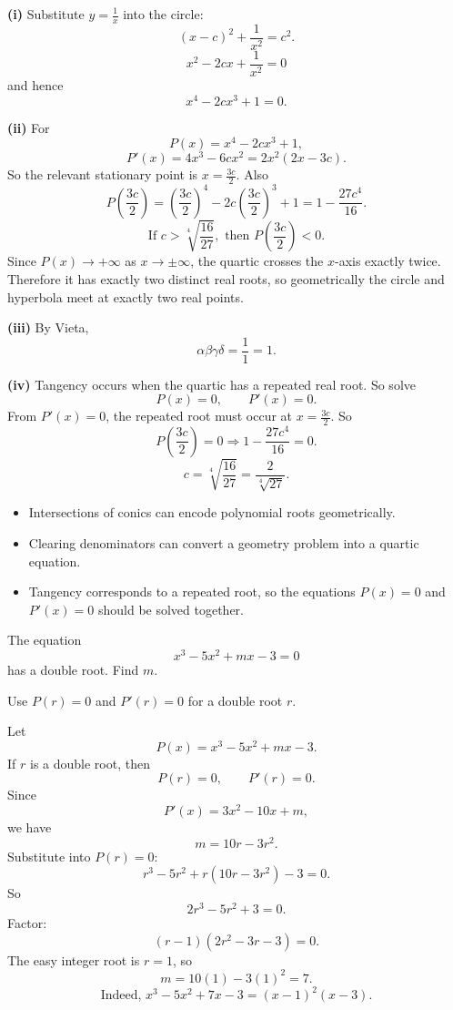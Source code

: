 \begin{solution}
\textbf{(i)} Substitute $y=\frac1x$ into the circle:
\[
(x-c)^2+\frac1{x^2}=c^2.
\]
\[
x^2-2cx+\frac1{x^2}=0
\]
and hence
\[
\boxed{x^4-2cx^3+1=0.}
\]

\textbf{(ii)} For
\[
P(x)=x^4-2cx^3+1,
\]
\[
P'(x)=4x^3-6cx^2=2x^2(2x-3c).
\]
So the relevant stationary point is $x=\frac{3c}{2}$. Also
\[
P\!\left(\frac{3c}{2}\right)=\left(\frac{3c}{2}\right)^4-2c\left(\frac{3c}{2}\right)^3+1
=1-\frac{27c^4}{16}.
\]
\[
\text{If }c>\sqrt[4]{\frac{16}{27}},\text{ then }P\!\left(\frac{3c}{2}\right)<0.
\]
Since $P(x)\to+\infty$ as $x\to\pm\infty$, the quartic crosses the $x$-axis exactly twice. Therefore it has exactly two distinct real roots, so geometrically the circle and hyperbola meet at exactly two real points.

\textbf{(iii)} By Vieta,
\[
\alpha\beta\gamma\delta=\frac{1}{1}=\boxed{1}.
\]

\textbf{(iv)} Tangency occurs when the quartic has a repeated real root. So solve
\[
P(x)=0,\qquad P'(x)=0.
\]
From $P'(x)=0$, the repeated root must occur at $x=\frac{3c}{2}$. So
\[
P\!\left(\frac{3c}{2}\right)=0
\Rightarrow 1-\frac{27c^4}{16}=0.
\]
\[
\boxed{c=\sqrt[4]{\frac{16}{27}}=\frac{2}{\sqrt[4]{27}}.}
\]
\end{solution}

\begin{takeaways}
\begin{itemize}[leftmargin=*]
\item Intersections of conics can encode polynomial roots geometrically.
\item Clearing denominators can convert a geometry problem into a quartic equation.
\item Tangency corresponds to a repeated root, so the equations $P(x)=0$ and $P'(x)=0$ should be solved together.
\end{itemize}
\end{takeaways}

\begin{problem}
The equation
\[
x^3-5x^2+mx-3=0
\]
has a double root. Find $m$.
\end{problem}

\begin{hintbox}
Use $P(r)=0$ and $P'(r)=0$ for a double root $r$.
\end{hintbox}

\begin{solution}
Let
\[
P(x)=x^3-5x^2+mx-3.
\]
If $r$ is a double root, then
\[
P(r)=0,\qquad P'(r)=0.
\]
Since
\[
P'(x)=3x^2-10x+m,
\]
we have
\[
m=10r-3r^2.
\]
Substitute into $P(r)=0$:
\[
r^3-5r^2+r(10r-3r^2)-3=0.
\]
So
\[
2r^3-5r^2+3=0.
\]
Factor:
\[
(r-1)(2r^2-3r-3)=0.
\]
The easy integer root is $r=1$, so
\[
\boxed{m=10(1)-3(1)^2=7.}
\]
\[
\text{Indeed, }x^3-5x^2+7x-3=(x-1)^2(x-3).
\]
\end{solution}

